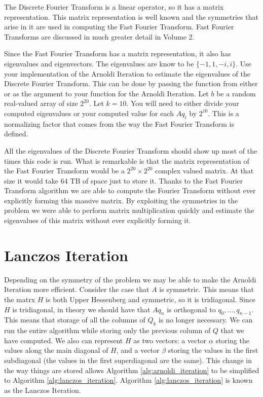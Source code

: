 \begin{problem}
The Discrete Fourier Transform is a linear operator, so it has a matrix representation.
This matrix representation is well known and the symmetries that arise in it are used in computing the Fast Fourier Transform.
Fast Fourier Transforms are discussed in much greater detail in Volume 2.

Since the Fast Fourier Transform has a matrix representation, it also has eigenvalues and eigenvectors.
The eigenvalues are know to be $\lbrace -1, 1, -i, i \rbrace$.
Use your implementation of the Arnoldi Iteration to estimate the eigenvalues of the Discrete Fourier Transform.
This can be done by passing the  function from either  or  as the argument  to your function for the Arnoldi Iteration.
Let $b$ be a random real-valued array of size $2^{20}$.
Let $k = 10$.
You will need to either divide your computed eigenvalues or your computed value for each $A q_i$ by $2^{10}$.
This is a normalizing factor that comes from the way the Fast Fourier Transform is defined.

All the eigenvalues of the Discrete Fourier Transform should show up most of the times this code is run.
What is remarkable is that the matrix representation of the Fast Fourier Transform would be a $2^20 \times 2^20$ complex valued matrix.
At that size it would take $64$ TB of space just to store it.
Thanks to the Fast Fourier Transform algorithm we are able to compute the Fourier Transform without ever explicitly forming this massive matrix.
By exploiting the symmetries in the problem we were able to perform matrix multiplication quickly and estimate the eigenvalues of this matrix without ever explicitly forming it.
\end{problem}


\section*{Lanczos Iteration}

Depending on the symmetry of the problem we may be able to make the Arnoldi Iteration more efficient.
Consider the case that $A$ is symmetric.
This means that the matrx $H$ is both Upper Hessenberg and symmetric, so it is tridiagonal.
Since $H$ is tridiagonal, in theory we should have that $A q_n$ is orthogonal to $q_0, \dots, q_{n-1}$.
This means that storage of all the columns of $Q_k$ is no longer necessary.
We can run the entire algorithm while storing only the previous column of $Q$ that we have computed.
We also can represent $H$ as two vectors: a vector $\alpha$ storing the values along the main diagonal of $H$, and a vector $\beta$ storing the values in the first subdiagonal (the values in the first superdiagonal are the same).
This change in the way things are stored allows Algorithm \ref{alg:arnoldi_iteration} to be simplified to Algorithm \ref{alg:lanczos_iteration}.
Algorithm \ref{alg:lanczos_iteration} is known as the Lanczos Iteration.

